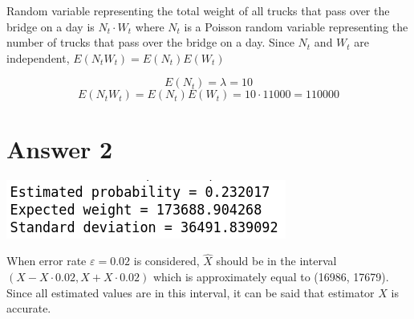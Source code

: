\documentclass[12pt]{article}
\begin{document}
Random variable representing the total weight of all trucks that pass over the bridge on a day is $N_t \cdot W_t$ where $N_t$ is a Poisson random variable representing the number of trucks that pass over the bridge on a day. Since $N_t$ and $W_t$ are independent, $E(N_tW_t) = E(N_t)E(W_t)$

\begin{equation*}
	E(N_t) = \lambda = 10
\end{equation*}
\begin{equation*}
	E(N_tW_t) = E(N_t)E(W_t)=10 \cdot 11000 = 110000
\end{equation*}
\section*{Answer 2}
\begin{center}
	\includegraphics{estimates}
\end{center}

When error rate $\varepsilon = 0.02$ is considered, $\hat{X}$ should be in the interval $(X - X\cdot0.02, X + X \cdot 0.02)$ which is approximately equal to (16986, 17679). Since all estimated values are in this interval, it can be said that estimator $X$ is accurate.
\end{document}
